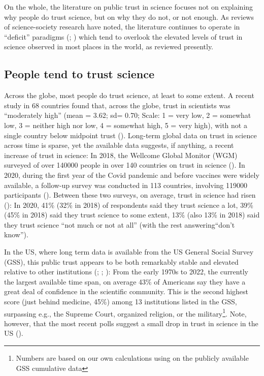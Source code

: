 \documentclass[
  jou,
  floatsintext,
  longtable,
  nolmodern,
  notxfonts,
  notimes,
  colorlinks=true,linkcolor=blue,citecolor=blue,urlcolor=blue]{apa7}
\begin{document}
On the whole, the literature on public trust in science focuses not on
explaining why people do trust science, but on why they do not, or not
enough. As reviews of science-society research have noted, the
literature continues to operate in ``deficit'' paradigms
(;
) which
tend to overlook the elevated levels of trust in science observed in
most places in the world, as reviewed presently.

\subsection{People tend to trust
science}\label{people-tend-to-trust-science}

Across the globe, most people do trust science, at least to some extent.
A recent study in 68 countries found that, across the globe, trust in
scientists was ``moderately high'' (mean = 3.62; sd= 0.70; Scale: 1 =
very low, 2 = somewhat low, 3 = neither high nor low, 4 = somewhat high,
5 = very high), with not a single country below midpoint trust
().
Long-term global data on trust in science across time is sparse, yet the
available data suggests, if anything, a recent increase of trust in
science: In 2018, the Wellcome Global Monitor (WGM) surveyed of over
140000 people in over 140 countries on trust in science
(). In 2020, during the first year of the Covid
pandemic and before vaccines were widely available, a follow-up survey
was conducted in 113 countries, involving 119000 participants
(). Between these two surveys, on average, trust in
science had risen
(): In 2020, 41\% (32\% in 2018) of respondents said
they trust science a lot, 39\% (45\% in 2018) said they trust science to
some extent, 13\% (also 13\% in 2018) said they trust science ``not much
or not at all'' (with the rest answering``don't know'').

In the US, where long term data is available from the US General Social
Survey (GSS), this public trust appears to be both remarkably stable and
elevated relative to other institutions
(;
; ): From the early 1970s to 2022, the currently the largest
available time span, on average 43\% of Americans say they have a great
deal of confidence in the scientific community. This is the second
highest score (just behind medicine, 45\%) among 13 institutions listed
in the GSS, surpassing e.g., the Supreme Court, organized religion, or
the military\footnote{Numbers are based on our own calculations using on
  the publicly available GSS cumulative data}. Note, however, that the
most recent polls suggest a small drop in trust in science in the US
().
\end{document}
